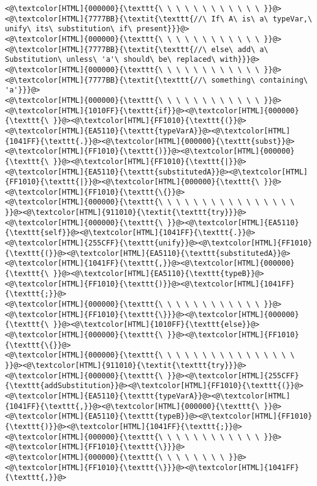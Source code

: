 \begin{lstlisting}
<@\textcolor[HTML]{000000}{\texttt{\ \ \ \ \ \ \ \ \ \ \ \ }}@><@\textcolor[HTML]{7777BB}{\textit{\texttt{//\ If\ A\ is\ a\ typeVar,\ unify\ its\ substitution\ if\ present}}}@>
<@\textcolor[HTML]{000000}{\texttt{\ \ \ \ \ \ \ \ \ \ \ \ }}@><@\textcolor[HTML]{7777BB}{\textit{\texttt{//\ else\ add\ a\ Substitution\ unless\ 'a'\ should\ be\ replaced\ with}}}@>
<@\textcolor[HTML]{000000}{\texttt{\ \ \ \ \ \ \ \ \ \ \ \ }}@><@\textcolor[HTML]{7777BB}{\textit{\texttt{//\ something\ containing\ 'a'}}}@>
<@\textcolor[HTML]{000000}{\texttt{\ \ \ \ \ \ \ \ \ \ \ \ }}@><@\textcolor[HTML]{1010FF}{\texttt{if}}@><@\textcolor[HTML]{000000}{\texttt{\ }}@><@\textcolor[HTML]{FF1010}{\texttt{(}}@><@\textcolor[HTML]{EA5110}{\texttt{typeVarA}}@><@\textcolor[HTML]{1041FF}{\texttt{.}}@><@\textcolor[HTML]{000000}{\texttt{subst}}@><@\textcolor[HTML]{FF1010}{\texttt{)}}@><@\textcolor[HTML]{000000}{\texttt{\ }}@><@\textcolor[HTML]{FF1010}{\texttt{|}}@><@\textcolor[HTML]{EA5110}{\texttt{substitutedA}}@><@\textcolor[HTML]{FF1010}{\texttt{|}}@><@\textcolor[HTML]{000000}{\texttt{\ }}@><@\textcolor[HTML]{FF1010}{\texttt{\{}}@>
<@\textcolor[HTML]{000000}{\texttt{\ \ \ \ \ \ \ \ \ \ \ \ \ \ \ \ }}@><@\textcolor[HTML]{911010}{\textit{\texttt{try}}}@><@\textcolor[HTML]{000000}{\texttt{\ }}@><@\textcolor[HTML]{EA5110}{\texttt{self}}@><@\textcolor[HTML]{1041FF}{\texttt{.}}@><@\textcolor[HTML]{255CFF}{\texttt{unify}}@><@\textcolor[HTML]{FF1010}{\texttt{(}}@><@\textcolor[HTML]{EA5110}{\texttt{substitutedA}}@><@\textcolor[HTML]{1041FF}{\texttt{,}}@><@\textcolor[HTML]{000000}{\texttt{\ }}@><@\textcolor[HTML]{EA5110}{\texttt{typeB}}@><@\textcolor[HTML]{FF1010}{\texttt{)}}@><@\textcolor[HTML]{1041FF}{\texttt{;}}@>
<@\textcolor[HTML]{000000}{\texttt{\ \ \ \ \ \ \ \ \ \ \ \ }}@><@\textcolor[HTML]{FF1010}{\texttt{\}}}@><@\textcolor[HTML]{000000}{\texttt{\ }}@><@\textcolor[HTML]{1010FF}{\texttt{else}}@><@\textcolor[HTML]{000000}{\texttt{\ }}@><@\textcolor[HTML]{FF1010}{\texttt{\{}}@>
<@\textcolor[HTML]{000000}{\texttt{\ \ \ \ \ \ \ \ \ \ \ \ \ \ \ \ }}@><@\textcolor[HTML]{911010}{\textit{\texttt{try}}}@><@\textcolor[HTML]{000000}{\texttt{\ }}@><@\textcolor[HTML]{255CFF}{\texttt{addSubstitution}}@><@\textcolor[HTML]{FF1010}{\texttt{(}}@><@\textcolor[HTML]{EA5110}{\texttt{typeVarA}}@><@\textcolor[HTML]{1041FF}{\texttt{,}}@><@\textcolor[HTML]{000000}{\texttt{\ }}@><@\textcolor[HTML]{EA5110}{\texttt{typeB}}@><@\textcolor[HTML]{FF1010}{\texttt{)}}@><@\textcolor[HTML]{1041FF}{\texttt{;}}@>
<@\textcolor[HTML]{000000}{\texttt{\ \ \ \ \ \ \ \ \ \ \ \ }}@><@\textcolor[HTML]{FF1010}{\texttt{\}}}@>
<@\textcolor[HTML]{000000}{\texttt{\ \ \ \ \ \ \ \ }}@><@\textcolor[HTML]{FF1010}{\texttt{\}}}@><@\textcolor[HTML]{1041FF}{\texttt{,}}@>

\end{lstlisting}
